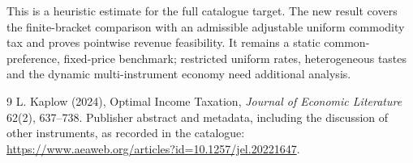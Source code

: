 \documentclass[11pt]{article}
\theoremstyle{definition}
\begin{document}
This is a heuristic estimate for the full catalogue target.
The new result covers the finite-bracket comparison with an admissible adjustable uniform commodity tax and proves pointwise revenue feasibility. It remains a static common-preference, fixed-price benchmark; restricted uniform rates, heterogeneous tastes and the dynamic multi-instrument economy need additional analysis.

\begin{thebibliography}{9}
 L. Kaplow (2024), Optimal Income Taxation, \emph{Journal of Economic Literature} 62(2), 637--738. Publisher abstract and metadata, including the discussion of other instruments, as recorded in the catalogue: \url{https://www.aeaweb.org/articles?id=10.1257/jel.20221647}.
\end{thebibliography}
\end{document}
